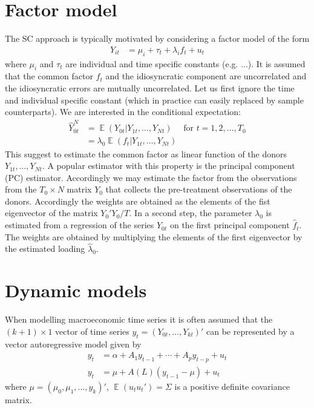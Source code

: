 \documentclass[12pt,a4paper]{article}
\def\E{\mathop{\mathbb{E}}\limits}
\begin{document}
\section{Factor model}
%
The SC approach is typically motivated by considering a factor model of the form
\begin{align*}
Y_{it} &= \mu_i + \tau_t + \lambda_i f_t + u_t
\end{align*}
where $\mu_i$ and $\tau_t$ are individual and time specific constants (e.g. ...). It is assumed that the common factor $f_t$ and the idiosyncratic component are uncorrelated and the idiosyncratic errors are mutually uncorrelated. Let us first ignore the time and individual specific constant (which in practice can easily replaced by sample counterparts). We are interested in the conditional expectation:
\begin{align*}
\widehat Y_{0t}^N &=  \E( Y_{0t}| Y_{1t},\ldots,Y_{Nt} ) \quad \text{ for } t=1,2,\ldots, T_0\\
&=  \lambda_0 \E( f_{t}| Y_{1t},\ldots,Y_{Nt} )
\end{align*}
This suggest to estimate the common factor as linear function of the donors $Y_{1t},\ldots,Y_{Nt}$. A popular estimator with this property is the principal component (PC) estimator. Accordingly we may estimate the factor from the observations from the $T_0\times N$ matrix $Y_0$ that collects the pre-treatment observations of the donors. Accordingly the weights are obtained as the elements of the fist eigenvector of the matrix $Y_0'Y_0/T$. In a second step, the parameter $\lambda_0$ is estimated from a regression of the series $Y_{0t}$ on the first principal component $\widehat f_t$. The weights are obtained by multiplying the elements of the first eigenvector by the estimated loading $\widehat \lambda_0$.


\section{Dynamic models}
%
When modelling macroeconomic time series it is often assumed that the $(k+1) \times 1$ vector of time series $y_t=(Y_{0t},\ldots,Y_{kt})'$ can be represented by a vector autoregressive model given by
\begin{align*}
y_t &= \alpha + A_1 y_{t-1} + \cdots + A_p y_{t-p} + u_t \\
y_t &= \mu + A(L)(y_{t-1}-\mu) + u_t
\end{align*}
where $\mu=(\mu_0,\mu_1,\ldots,y_k)'$, $\E(u_t u_t')=\Sigma$ is a positive definite covariance matrix.
\end{document}
